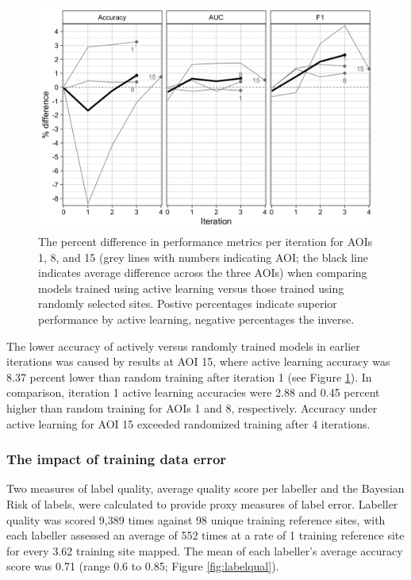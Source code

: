 \documentclass[
  11pt,
  a4paper]{article}
\begin{document}
\begin{figure}[!ht]

{\centering \includegraphics[width=0.9\linewidth,]{figures/si_random_vs_active} 

}

\caption{The percent difference in performance metrics per iteration for AOIs 1, 8, and 15 (grey lines with numbers indicating AOI; the black line indicates average difference across the three AOIs) when comparing models trained using active learning versus those trained using randomly selected sites. Postive percentages indicate superior performance by active learning, negative percentages the inverse.}\label{fig:randomvactive}
\end{figure}

The lower accuracy of actively versus randomly trained models in earlier
iterations was caused by results at AOI 15, where active learning
accuracy was 8.37 percent lower than random training after iteration 1
(see Figure \ref{fig:randomvactive}). In comparison, iteration 1 active
learning accuracies were 2.88 and 0.45 percent higher than random
training for AOIs 1 and 8, respectively. Accuracy under active learning
for AOI 15 exceeded randomized training after 4 iterations.

\hypertarget{the-impact-of-training-data-error}{%
\subsubsection{The impact of training data
error}\label{the-impact-of-training-data-error}}

Two measures of label quality, average quality score per labeller and
the Bayesian Risk of labels, were calculated to provide proxy measures
of label error. Labeller quality was scored 9,389 times against 98
unique training reference sites, with each labeller assessed an average
of 552 times at a rate of 1 training reference site for every 3.62
training site mapped. The mean of each labeller's average accuracy score
was 0.71 (range 0.6 to 0.85; Figure \ref{fig:labelqual}).
\end{document}
